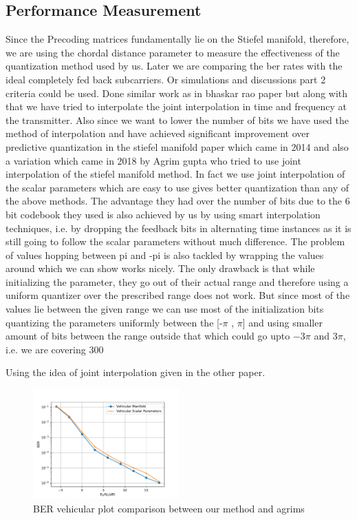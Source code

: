 \documentclass[conference]{IEEEtran}
\begin{document}
\subsection{Performance Measurement}
\label{setting}

\noindent Since the Precoding matrices fundamentally lie on the Stiefel manifold, therefore, we are using the chordal distance parameter to measure the effectiveness of the quantization method used by us. Later we are comparing the ber rates with the ideal completely fed back subcarriers. Or simulations and discussions part 2 criteria could be used. Done similar work as in bhaskar rao paper but along with that we have tried to interpolate the joint interpolation in time and frequency at the transmitter. Also since we want to lower the number of bits we have used the method of interpolation and have achieved significant improvement over predictive quantization in the stiefel manifold paper which came in 2014 and also a variation which came in 2018 by Agrim gupta who tried to use joint interpolation of the stiefel manifold method. In fact we use joint interpolation of the scalar parameters which are easy to use gives better quantization than any of the above methods. 
The advantage they had over the number of bits due to the 6 bit codebook they used is also achieved by us by using smart interpolation techniques, i.e. by dropping the feedback bits in alternating time instances as it is still going to follow the scalar parameters without much difference. 
The problem of values hopping between pi and -pi is also tackled by wrapping the values around which we can show works nicely. The only drawback is that while initializing the parameter, they go out of their actual range and therefore using a uniform quantizer over the prescribed range does not work. But since most of the values lie between the given range we can use most of the initialization bits quantizing the parameters uniformly between the [-$\pi$ , $\pi$] and using smaller amount of bits between the range outside that which could go upto $-3\pi$ and $3\pi$, i.e. we are covering 300%

Using the idea of joint interpolation given in the other paper.  
\begin{figure}
\includegraphics[width=0.5\textwidth]{images/vehicular_ber.pdf}

\caption{BER vehicular plot comparison between our method and agrims} 
\label{ber_overview}
\vspace{-5pt}
\end{figure}
\end{document}
